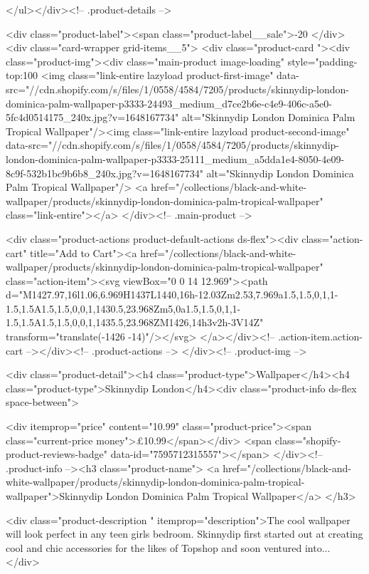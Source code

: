 {{{{{{{      </ul></div><!-- .product-details -->

<div class="product-label"><span class="product-label__sale">-20%
          </div><div class="card-wrapper grid-items__5">
            <div class="product-card "><div class="product-img"><div class="main-product image-loading" style="padding-top:100%
      <img class="link-entire lazyload product-first-image" data-src="//cdn.shopify.com/s/files/1/0558/4584/7205/products/skinnydip-london-dominica-palm-wallpaper-p3333-24493_medium_d7ce2b6e-c4e9-406c-a5e0-5fc4d0514175_240x.jpg?v=1648167734" alt="Skinnydip London Dominica Palm Tropical Wallpaper"/><img class="link-entire lazyload product-second-image" data-src="//cdn.shopify.com/s/files/1/0558/4584/7205/products/skinnydip-london-dominica-palm-wallpaper-p3333-25111_medium_a5dda1e4-8050-4e09-8c9f-532b1bc9b6b8_240x.jpg?v=1648167734" alt="Skinnydip London Dominica Palm Tropical Wallpaper"/>
      <a href="/collections/black-and-white-wallpaper/products/skinnydip-london-dominica-palm-tropical-wallpaper" class="link-entire"></a>
    </div><!-- .main-product -->
  
<div class="product-actions product-default-actions ds-flex"><div class="action-cart" title="Add to Cart"><a href="/collections/black-and-white-wallpaper/products/skinnydip-london-dominica-palm-tropical-wallpaper" class="action-item"><svg viewBox="0 0 14 12.969"><path d="M1427.97,16l1.06,6.969H1437L1440,16h-12.03Zm2.53,7.969a1.5,1.5,0,1,1-1.5,1.5A1.5,1.5,0,0,1,1430.5,23.968Zm5,0a1.5,1.5,0,1,1-1.5,1.5A1.5,1.5,0,0,1,1435.5,23.968ZM1426,14h3v2h-3V14Z" transform="translate(-1426 -14)"/></svg>
</a></div><!-- .action-item.action-cart --></div><!-- .product-actions -->
</div><!-- .product-img -->

<div class="product-detail"><h4 class="product-type">Wallpaper</h4><h4 class="product-type">Skinnydip London</h4><div class="product-info ds-flex space-between">
    
<div itemprop="price" content="10.99" class="product-price"><span class="current-price money">£10.99</span></div>
    <span class="shopify-product-reviews-badge" data-id="7595712315557"></span>
  </div><!-- .product-info --><h3 class="product-name">
      <a href="/collections/black-and-white-wallpaper/products/skinnydip-london-dominica-palm-tropical-wallpaper">Skinnydip London Dominica Palm Tropical Wallpaper</a>
    </h3>
    
<div class="product-description " itemprop="description">The cool wallpaper will look perfect in any teen girls bedroom. Skinnydip first started out at creating cool and chic accessories for the likes of Topshop and soon ventured into...
</div>



}}}}}}}
